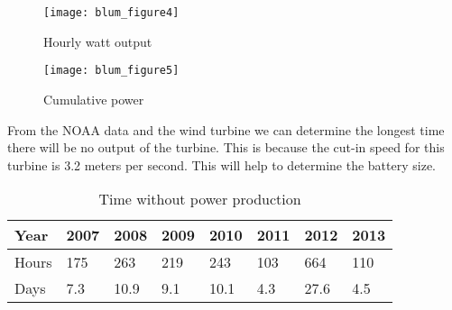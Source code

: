\begin{figure}
\centering
\texttt{[image: blum\_figure4]}
\caption{Hourly watt output}
\label{fig:Hourly output in watts}
\end{figure}


\begin{figure}
\centering
\texttt{[image: blum\_figure5]}
\caption{Cumulative power}
\label{fig: Cumlative power}
\end{figure}

From the NOAA data and the wind turbine we can determine the longest time there will be no output of the turbine. This is because the cut-in speed for this turbine is 3.2 meters per second. This will help to determine the battery size. 

\begin{table}
\centering
\begin{tabular}{|l|l|l|l|l|l|l|l|}\hline
Year & 2007 & 2008 & 2009 & 2010 & 2011 & 2012 &2013\\\hline
Hours & 175 & 263 & 219 & 243 & 103 & 664 & 110\\\hline
Days & 7.3 & 10.9 & 9.1 & 10.1 & 4.3 & 27.6& 4.5\\\hline
\end{tabular}
\caption{\label{tab:widgets}Time without power production}
\end{table}

